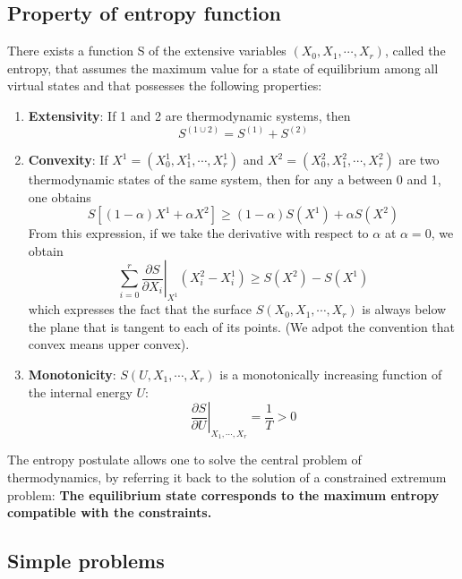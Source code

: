 \documentclass[cyan]{elegantnote}
\begin{document}
\subsection{Property of entropy function}
There exists a function S of the extensive variables $(X_0, X_1, \cdots, X_r)$, called the entropy, that assumes the maximum value for a state of equilibrium among all virtual states and that possesses the following properties:
\begin{enumerate}
\item \textbf{Extensivity}: If 1 and 2 are thermodynamic systems, then 
\[ S^{(1 \cup 2)} = S^{(1)} + S^{(2)} \]
\item \textbf{Convexity}: If $ X^1 = (X_0^1, X_1^1, \cdots, X_r^1)$ and $X^2 = (X_0^2, X_1^2, \cdots, X_r^2)$ are two thermodynamic states of the same system, then for any a between 0 and 1, one obtains
\[ S[(1-\alpha)X^1 + \alpha X^2] \geq (1 - \alpha)S(X^1) + \alpha S(X^2) \]
From this expression, if we take the derivative with respect to $\alpha$ at $\alpha = 0$, we obtain
\[\left. \sum_{i=0}^{r} \frac{\partial S}{\partial X_i} \right|_{X^1} (X_i^2 - X_i^1) \geq S(X^2) - S(X^1) \]
which expresses the fact that the surface $S(X_0, X_1, \cdots, X_r)$ is always below the plane that
is tangent to each of its points. (We adpot the convention that convex means upper convex).
\item \textbf{Monotonicity}: $S(U, X_1, \cdots, X_r)$ is a monotonically increasing function of the internal energy $U$:
\[\left. \frac{\partial S}{\partial U} \right|_{X_1,\cdots,X_r} = \frac{1}{T} > 0\]
\end{enumerate}
The entropy postulate allows one to solve the central problem of thermodynamics, by referring it back to the solution of a constrained extremum problem:
\textbf{The equilibrium state corresponds to the maximum entropy compatible with the constraints.}

\subsection{Simple problems}
\end{document}

